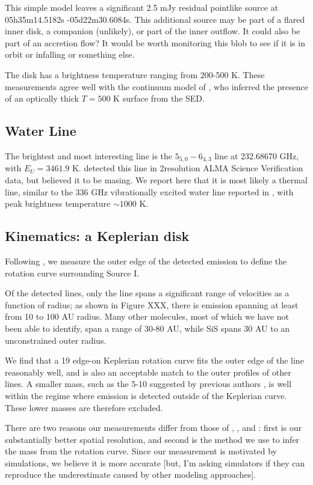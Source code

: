 \documentclass[twocolumn]{aastex61}
\begin{document}
This simple model leaves a significant 2.5 mJy residual pointlike source at 
05h35m14.5182s -05d22m30.6084s.  This additional source may be part of a flared
inner disk, a companion (unlikely), or part of the inner outflow.  It could
also be part of an accretion flow?  It would be worth monitoring this blob
to see if it is in orbit or infalling or something else.

The disk has a brightness temperature ranging from 200-500 K.  These measurements
agree well with the continuum model of \citet{Plambeck2016a}, who inferred
the presence of an optically thick $T=500$ K surface from the SED.

\subsection{Water Line}
The brightest and most interesting line is the \water $5_{5,0}-6_{4,3}$ line at
232.68670 GHz, with $E_U=3461.9$ K.  \citet{Hirota2012a} detected this line
in 2\arcsec resolution ALMA Science Verification data, but believed it to be masing.
We report here that it is most likely a thermal line, similar to the 336 GHz vibrationally
excited water line reported in \citet{Hirota2014a}, with peak brightness
temperature $\sim1000$ K.

\subsection{Kinematics: a Keplerian disk}
Following \citet{Seifried2016a}, we measure the outer edge of the detected
emission to define the rotation curve surrounding Source I.

Of the detected lines, only the \water line spans a significant range of velocities
as a function of radius; as shown in Figure XXX, there is \water emission
spanning at least from 10 to 100 AU radius.  Many other molecules, most of
which we have not been able to identify, span a range of 30-80 AU, while SiS
spans 30 AU to an unconstrained outer radius.

We find that a 19 \msun edge-on Keplerian rotation curve fits the outer edge
of the \water line reasonably well, and is also an acceptable match to
the outer profiles of other lines.  A smaller mass, such as the 5-10 \msun
suggested by previous authors \citep{}, is well within the regime where emission
is detected outside of the Keplerian curve.  These lower masses are therefore
excluded.

There are two reasons our measurements differ from those of \citet{Plambeck2016a},
\citet{Hirota2014a}, and \citet{Wright2010a}: first is our substantially better
spatial resolution, and second is the method we use to infer the mass from the
rotation curve.  Since our measurement is motivated by simulations, we believe
it is more accurate [but, I'm asking simulators if they can reproduce the underestimate
caused by other modeling approaches].
\end{document}
